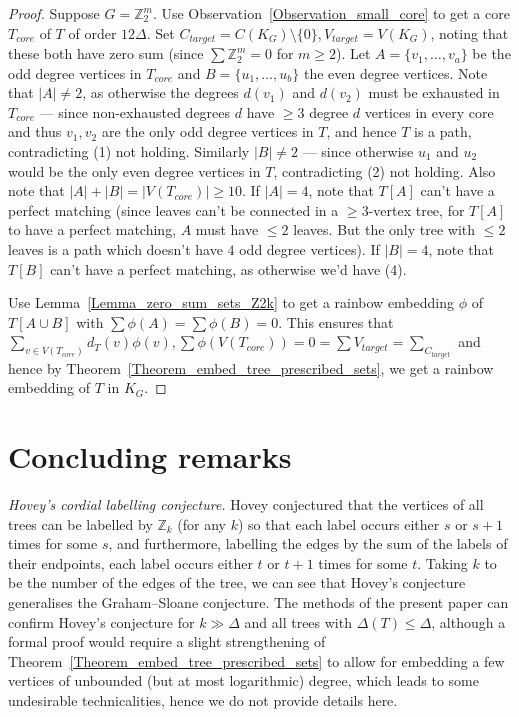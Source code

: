 \documentclass[a4paper,11pt,hidelinks]{amsart}
\theoremstyle{definition}
\begin{document}
\begin{proof}
Suppose $G= \mathbb{Z}_2^m$. Use Observation~\ref{Observation_small_core} to get a core $T_{core}$ of $T$ of order $12\Delta$. Set $C_{target}=C(K_G)\setminus\{0\}, V_{target}=V(K_G)$, noting that these both have zero sum (since $\sum \mathbb{Z}_2^m=0$ for $m\geq 2$).
Let $A=\{v_1, \dots, v_a\}$ be the odd degree vertices in $T_{core}$ and $B=\{u_1, \dots, u_b\}$ the even degree vertices. Note that $|A|\neq 2$, as otherwise the degrees $d(v_1)$ and $d(v_2)$ must be exhausted in $T_{core}$ --- since non-exhausted degrees $d$ have $\geq 3$ degree $d$ vertices in every core and thus $v_1, v_2$ are the only odd degree vertices in $T$, and hence $T$ is a path, contradicting (1) not holding. Similarly $|B|\neq 2$ --- since otherwise $u_1$ and $u_2$ would be the only even degree vertices in $T$, contradicting (2) not holding.
 Also note that $|A|+|B|=|V(T_{core})|\geq 10$. If $|A|=4$, note that $T[A]$ can't have  a perfect matching (since leaves can't be connected in a $\ge 3$-vertex tree, for $T[A]$ to have a perfect matching, $A$ must have $\le 2$ leaves. But the only tree with $\le 2$ leaves is a path which doesn't have $4$ odd degree vertices). If $|B|=4$, note that $T[B]$ can't have  a perfect matching, as otherwise we'd have (4).
 
 Use Lemma~\ref{Lemma_zero_sum_sets_Z2k} to get a rainbow embedding $\phi$ of $T[A\cup B]$ with $\sum \phi(A)=\sum \phi(B)=0$. This ensures that $\sum_{v\in V(T_{core})}d_T(v)\phi(v), \sum \phi(V(T_{core}))=0=\sum V_{target}=\sum_{C_{target}}$ and hence by Theorem~\ref{Theorem_embed_tree_prescribed_sets},  we get a rainbow embedding of $T$ in $K_G$.
\end{proof}

\section{Concluding remarks}\label{sec:conc}
\textit{Hovey's cordial labelling conjecture.} Hovey \cite{hovey1991cordial} conjectured that the vertices of all trees can be labelled by $\mathbb{Z}_k$ (for any $k$) so that each label occurs either $s$ or $s+1$ times for some $s$, and furthermore, labelling the edges by the sum of the labels of their endpoints, each label occurs either $t$ or $t+1$ times for some $t$. Taking $k$ to be the number of the edges of the tree, we can see that Hovey's conjecture generalises the Graham--Sloane conjecture. The methods of the present paper can confirm Hovey's conjecture for  $k\gg \Delta$ and all trees with $\Delta(T)\le \Delta$, although a formal proof would require a slight strengthening of Theorem~\ref{Theorem_embed_tree_prescribed_sets} to allow for embedding a few vertices of unbounded (but at most logarithmic) degree, which leads to some undesirable technicalities, hence we do not provide details here. 
\end{document}

